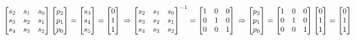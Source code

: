 \documentclass{article}
\begin{document}
\subsection{}
\begin{latin}
$
\begin{bmatrix}
s_2 & s_1 & s_0 \\
s_3 & s_2 & s_1 \\
s_4 & s_3 & s_2
\end{bmatrix}
\begin{bmatrix}
p_2 \\
p_1 \\
p_0
\end{bmatrix}=
\begin{bmatrix}
s_3 \\
s_4 \\
s_5
\end{bmatrix}=
\begin{bmatrix}
0 \\
1 \\
1
\end{bmatrix} \\ \Rightarrow
\begin{bmatrix}
s_2 & s_1 & s_0 \\
s_3 & s_2 & s_1 \\
s_4 & s_3 & s_2
\end{bmatrix}^{-1}=
\begin{bmatrix}
1 & 0 & 0 \\
0 & 1 & 0 \\
0 & 0 & 1
\end{bmatrix} \\ \Rightarrow
\begin{bmatrix}
p_2 \\
p_1 \\
p_0
\end{bmatrix}=
\begin{bmatrix}
1 & 0 & 0 \\
0 & 1 & 0 \\
0 & 0 & 1
\end{bmatrix}
\begin{bmatrix}
0 \\
1 \\
1
\end{bmatrix}=
\begin{bmatrix}
0 \\
1 \\
1
\end{bmatrix}
$
\end{latin}
\end{document}
